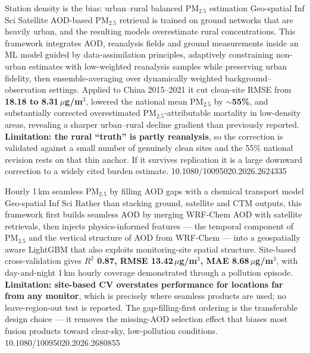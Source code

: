 \documentclass[10pt]{article}
\begin{document}

{Station density is the bias: urban--rural balanced PM$_{2.5}$ estimation}
{Geo-spatial Inf Sci}
{Satellite AOD-based PM$_{2.5}$ retrieval is trained on ground networks that are heavily
urban, and the resulting models overestimate rural concentrations. This framework
integrates AOD, reanalysis fields and ground measurements inside an ML model guided by
data-assimilation principles, adaptively constraining non-urban estimates with
low-weighted reanalysis samples while preserving urban fidelity, then ensemble-averaging
over dynamically weighted background--observation settings. Applied to China 2015--2021 it
cut clean-site RMSE from \textbf{18.18 to 8.31\,$\mu$g/m$^3$}, lowered the national mean
PM$_{2.5}$ by \textbf{$\sim$55\%}, and substantially corrected overestimated
PM$_{2.5}$-attributable mortality in low-density areas, revealing a sharper urban--rural
decline gradient than previously reported. \textbf{Limitation: the rural ``truth'' is
partly reanalysis}, so the correction is validated against a small number of genuinely
clean sites and the 55\% national revision rests on that thin anchor. If it survives
replication it is a large downward correction to a widely cited burden estimate.}
{10.1080/10095020.2026.2624335}

{Hourly 1\,km seamless PM$_{2.5}$ by filling AOD gaps with a chemical transport model}
{Geo-spatial Inf Sci}
{Rather than stacking ground, satellite and CTM outputs, this framework first builds
seamless AOD by merging WRF-Chem AOD with satellite retrievals, then injects
physics-informed features --- the temporal component of PM$_{2.5}$ and the vertical
structure of AOD from WRF-Chem --- into a geospatially aware LightGBM that also exploits
monitoring-site spatial structure. Site-based cross-validation gives \textbf{$R^2$ 0.87,
RMSE 13.42\,$\mu$g/m$^3$, MAE 8.68\,$\mu$g/m$^3$}, with day-and-night 1\,km hourly
coverage demonstrated through a pollution episode. \textbf{Limitation: site-based CV
overstates performance for locations far from any monitor}, which is precisely where
seamless products are used; no leave-region-out test is reported. The gap-filling-first
ordering is the transferable design choice --- it removes the missing-AOD selection effect
that biases most fusion products toward clear-sky, low-pollution conditions.}
{10.1080/10095020.2026.2680855}
\end{document}
